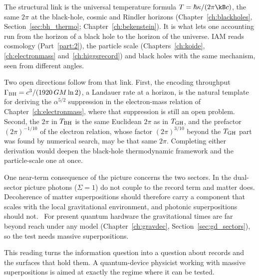 The structural link is the universal temperature formula $T=\hbar\kappa/(2\pi\kB c)$, the same $2\pi$ at the black-hole, cosmic and Rindler horizons
(Chapter~\ref{ch:blackholes}, Section~\ref{sec:bh_thermo}; Chapter~\ref{ch:bekenstein}). It is what lets one accounting run from the horizon of a black hole to the horizon of the universe.
IAM reads cosmology (Part~\ref{part:2}), the particle scale (Chapters~\ref{ch:koide}, \ref{ch:electronmass} and~\ref{ch:higgsrecord}) and black holes with the same mechanism, seen from different angles. \interp

Two open directions follow from that link. First, the encoding throughput $\Gamma_{\rm BH}=c^3/(1920\,GM\ln2)$, a Landauer rate at a horizon, is the natural template
for deriving the $\alpha^{5/2}$ suppression in the electron-mass relation of Chapter~\ref{ch:electronmass}, where that suppression is still an open problem. Second, the $2\pi$
in $T_{\rm BH}$ is the same Euclidean $2\pi$ as in $T_{\rm GH}$, and the prefactor $(2\pi)^{-1/10}$ of the electron relation, whose factor $(2\pi)^{3/10}$ beyond the $T_{\rm GH}$ part was found by numerical search, may be that same
$2\pi$. Completing either derivation would deepen the black-hole thermodynamic framework and the particle-scale one at once. \conjecture

One near-term consequence of the picture concerns the two sectors. In the dual-sector picture photons ($\Sigma=1$) do not couple to the record term and
matter does. Decoherence of matter superpositions should therefore carry a component that scales with the local gravitational environment, and photonic
superpositions should not. \conjecture\ For present quantum hardware the gravitational times are far beyond reach under any model (Chapter~\ref{ch:gravdec},
Section~\ref{sec:gd_sectors}), so the test needs massive superpositions.

This reading turns the information question into a question about records and the surfaces that hold them. A quantum-device physicist working with massive superpositions is aimed at exactly the regime where it can be tested.
